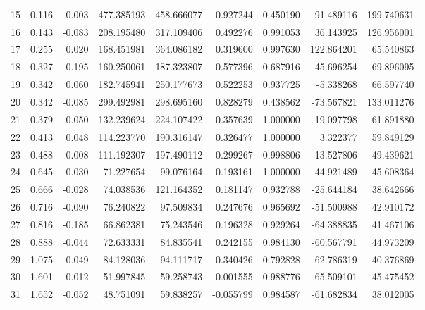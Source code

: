 \begin{tabular}{rrrrrrrrr}
      15 &  0.116 &  0.003 &  477.385193 &  458.666077 &    0.927244 &             0.450190 &       -91.489116 &  199.740631 \\
      16 &  0.143 & -0.083 &  208.195480 &  317.109406 &    0.492276 &             0.991053 &        36.143925 &  126.956001 \\
      17 &  0.255 &  0.020 &  168.451981 &  364.086182 &    0.319600 &             0.997630 &       122.864201 &   65.540863 \\
      18 &  0.327 & -0.195 &  160.250061 &  187.323807 &    0.577396 &             0.687916 &       -45.696254 &   69.896095 \\
      19 &  0.342 &  0.060 &  182.745941 &  250.177673 &    0.522253 &             0.937725 &        -5.338268 &   66.597740 \\
      20 &  0.342 & -0.085 &  299.492981 &  298.695160 &    0.828279 &             0.438562 &       -73.567821 &  133.011276 \\
      21 &  0.379 &  0.050 &  132.239624 &  224.107422 &    0.357639 &             1.000000 &        19.097798 &   61.891880 \\
      22 &  0.413 &  0.048 &  114.223770 &  190.316147 &    0.326477 &             1.000000 &         3.322377 &   59.849129 \\
      23 &  0.488 &  0.008 &  111.192307 &  197.490112 &    0.299267 &             0.998806 &        13.527806 &   49.439621 \\
      24 &  0.645 &  0.030 &   71.227654 &   99.076164 &    0.193161 &             1.000000 &       -44.921489 &   45.608364 \\
      25 &  0.666 & -0.028 &   74.038536 &  121.164352 &    0.181147 &             0.932788 &       -25.644184 &   38.642666 \\
      26 &  0.716 & -0.090 &   76.240822 &   97.509834 &    0.247676 &             0.965692 &       -51.500988 &   42.910172 \\
      27 &  0.816 & -0.185 &   66.862381 &   75.243546 &    0.196328 &             0.929264 &       -64.388835 &   41.467106 \\
      28 &  0.888 & -0.044 &   72.633331 &   84.835541 &    0.242155 &             0.984130 &       -60.567791 &   44.973209 \\
      29 &  1.075 & -0.049 &   84.128036 &   94.111717 &    0.340426 &             0.792828 &       -62.786319 &   40.376869 \\
      30 &  1.601 &  0.012 &   51.997845 &   59.258743 &   -0.001555 &             0.988776 &       -65.509101 &   45.475452 \\
      31 &  1.652 & -0.052 &   48.751091 &   59.838257 &   -0.055799 &             0.984587 &       -61.682834 &   38.012005 \\
\bottomrule
\end{tabular}
